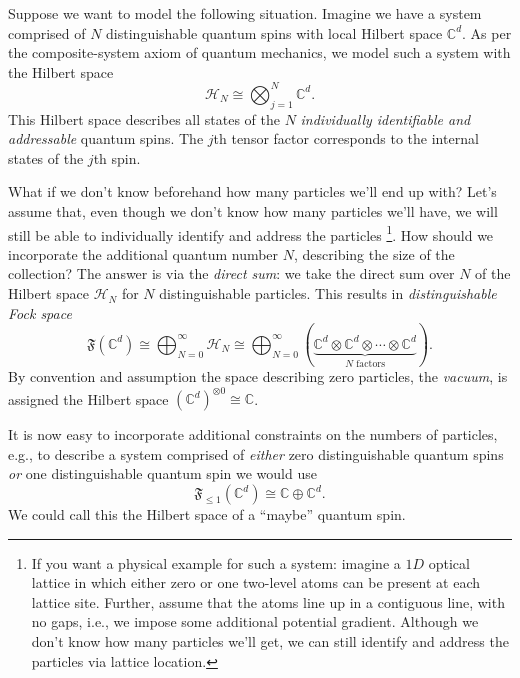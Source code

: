 Suppose we want to model the following situation. Imagine we have a system comprised of $N$ distinguishable quantum spins with local Hilbert space $\mathbb{C}^d$. As per the composite-system axiom of quantum mechanics, we model such a system with the Hilbert space
\begin{equation}
	\mathcal{H}_N \cong \bigotimes_{j=1}^N \mathbb{C}^d.
\end{equation}
This Hilbert space describes all states of the $N$ \emph{individually identifiable and addressable} quantum spins. The $j$th tensor factor corresponds to the internal states of the $j$th spin.

What if we don't know beforehand how many particles we'll end up with? Let's assume that, even though we don't know how many particles we'll have, we will still be able to individually identify and address the particles \footnote{If you want a physical example for such a system: imagine a $1D$ optical lattice in which either zero or one two-level atoms can be present at each lattice site. Further, assume that the atoms line up in a contiguous line, with no gaps, i.e., we impose some additional potential gradient. Although we don't know how many particles we'll get, we can still identify and address the particles via lattice location.}. How should we incorporate the additional quantum number $N$, describing the size of the collection? The answer is via the \emph{direct sum}: we take the direct sum over $N$ of the Hilbert space $\mathcal{H}_N$ for $N$ distinguishable particles. This results in \emph{distinguishable Fock space}
\begin{equation}
	\mathfrak{F}(\mathbb{C}^d) \cong \bigoplus_{N=0}^\infty \mathcal{H}_N\cong \bigoplus_{N=0}^\infty (\underbrace{\mathbb{C}^d\otimes \mathbb{C}^d\otimes \cdots \otimes \mathbb{C}^d}_{\text{$N$ factors}}).
\end{equation}
By convention and assumption the space describing zero particles, the \emph{vacuum}, is assigned the Hilbert space $(\mathbb{C}^d)^{\otimes 0} \cong \mathbb{C}$.

It is now easy to incorporate additional constraints on the numbers of particles, e.g., to describe a system comprised of \emph{either} zero distinguishable quantum spins \emph{or} one distinguishable quantum spin we would use
\begin{equation}
	\mathfrak{F}_{\le 1} (\mathbb{C}^d) \cong \mathbb{C}\oplus \mathbb{C}^d.
\end{equation}
We could call this the Hilbert space of a ``maybe'' quantum spin.

